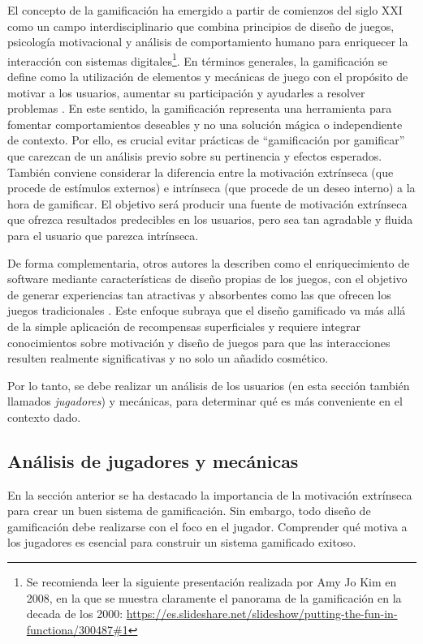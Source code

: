 El concepto de la gamificación ha emergido a partir de comienzos del siglo XXI como un campo interdisciplinario que combina principios de diseño de juegos, psicología motivacional y análisis de comportamiento humano para enriquecer la interacción con sistemas digitales\footnote{Se recomienda leer la siguiente presentación realizada por Amy Jo Kim en 2008, en la que se muestra claramente el panorama de la gamificación en la decada de los 2000: \url{https://es.slideshare.net/slideshow/putting-the-fun-in-functiona/300487\#1}}. En términos generales, la gamificación se define como la utilización de elementos y mecánicas de juego con el propósito de motivar a los usuarios, aumentar su participación y ayudarles a resolver problemas \citep{Zichermann_Cunningham_2011}. En este sentido, la gamificación representa una herramienta para fomentar comportamientos deseables y no una solución mágica o independiente de contexto. Por ello, es crucial evitar prácticas de “gamificación por gamificar” que carezcan de un análisis previo sobre su pertinencia y efectos esperados. También conviene considerar la diferencia entre la motivación extrínseca (que procede de estímulos externos) e intrínseca (que procede de un deseo interno) a la hora de gamificar. El objetivo será producir una fuente de motivación extrínseca que ofrezca resultados predecibles en los usuarios, pero sea tan agradable y fluida para el usuario que parezca intrínseca. 

De forma complementaria, otros autores la describen como el enriquecimiento de software mediante características de diseño propias de los juegos, con el objetivo de generar experiencias tan atractivas y absorbentes como las que ofrecen los juegos tradicionales \citep{Morschheuser_Hassan_Werder_Hamari_2018}. Este enfoque subraya que el diseño gamificado va más allá de la simple aplicación de recompensas superficiales y requiere integrar conocimientos sobre motivación y diseño de juegos para que las interacciones resulten realmente significativas y no solo un añadido cosmético.

Por lo tanto, se debe realizar un análisis de los usuarios (en esta sección también llamados \textit{jugadores}) y mecánicas, para determinar qué es más conveniente en el contexto dado.

\subsection{Análisis de jugadores y mecánicas}

En la sección anterior se ha destacado la importancia de la motivación extrínseca para crear un buen sistema de gamificación. Sin embargo, todo diseño de gamificación debe realizarse con el foco en el jugador. Comprender qué motiva a los jugadores es esencial para construir un sistema gamificado exitoso.

